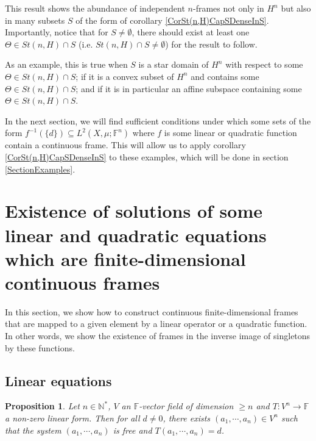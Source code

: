 \documentclass[a4paper,12pt]{article}
\theoremstyle{plain}
\newtheorem{proposition}{Proposition}[section]
\theoremstyle{definition}
\theoremstyle{remark}
\begin{document}
This result shows the abundance of independent $n$-frames not only in $H^n$ but also in many subsets $S$ of the form of corollary \ref{CorSt(n,H)CapSDenseInS}. Importantly, notice that for $S \neq \emptyset$, there should exist at least one $\Theta \in St(n,H) \cap S$ (i.e. $St(n,H) \cap S \neq \emptyset$) for the result to follow. 

As an example, this is true when $S$ is a star domain of $H^n$ with respect to some $\Theta \in St(n,H) \cap S$; if it is a convex subset of $H^n$ and contains some $\Theta \in St(n,H) \cap S$; and if it is in particular an affine subspace containing some $\Theta \in St(n,H) \cap S$.

In the next section, we will find sufficient conditions under which some sets of the form $f^{-1}(\{d\}) \subseteq L^2(X,\mu;\mathbb{F}^n)$ where $f$ is some linear or quadratic function contain a continuous frame. This will allow us to apply corollary \ref{CorSt(n,H)CapSDenseInS} to these examples, which will be done in section \ref{SectionExamples}.







\section{Existence of solutions of some linear and quadratic equations which are finite-dimensional continuous frames}
\label{SectionFrameSolutionLinQuadraticEq}

In this section, we show how to construct continuous finite-dimensional frames that are mapped to a given element by a linear operator or a quadratic function. In other words, we show the existence of frames in the inverse image of singletons by these functions.

\subsection{Linear equations}


\begin{proposition}
\label{PropT^(-1)(d)ContainsIndependentNTuplesTArbitraryLinearFormCondDimV}
Let $n \in \mathbb{N}^*$, $V$ an $\mathbb{F}$-vector field of dimension $\geq n$ and $T : V^n \to \mathbb{F}$ a non-zero linear form. Then for all $d \neq 0$, there exists $(a_1,\cdots,a_n) \in V^n$ such that the system $(a_1,\cdots,a_n)$ is free and $T(a_1,\cdots,a_n)=d$.
\end{proposition}
\end{document}
